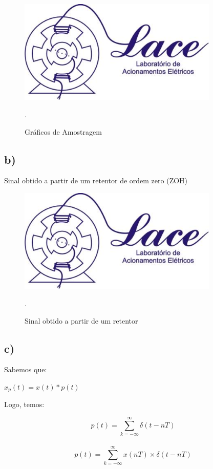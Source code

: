\documentclass{article}[a4paper,12pt,twoside]
\begin{document}
\begin{figure}[H]
    \centering
    \includegraphics[width=0.85\textwidth]{a}
    \caption{Gráficos de Amostragem}.
    \label{fig:my_label}
\end{figure}

\subsection{b)}
Sinal obtido a partir de um retentor de ordem zero (ZOH)

\begin{figure}[H]
    \centering
    \includegraphics[width=0.85\textwidth]{a}
    \caption{Sinal obtido a partir de um retentor}.
    \label{fig:my_label}
\end{figure}



\subsection{c)}
Sabemos que:
\begin{center}
    $x_p(t) = x(t) * p(t)$\\
    \vspace{0.25cm}
\end{center}

Logo, temos:
\begin{center}
    $$p(t) = \sum_{k=- \infty}^{\infty} \delta(t - nT)$$\\
    \vspace{0.25cm}
    $$p(t) = \sum_{k=- \infty}^{\infty} x(nT) \times \delta(t - nT)$$\\
    \vspace{0.25cm}
\end{center}
\end{document}
